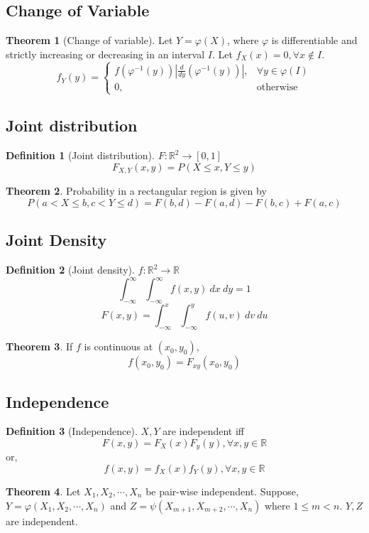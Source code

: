 \documentclass[10pt, a4paper]{extarticle}
\theoremstyle{definition}
\newtheorem{thm}{Theorem}
\newtheorem{defn}{Definition}
\begin{document}
\subsection{Change of Variable}
\begin{thm}[Change of variable]
	Let $Y=\varphi(X)$, where $\varphi$ is differentiable and strictly increasing or decreasing in an interval $I$. Let $f_X(x)=0,\forall x\notin I$.
	\[f_Y(y)=
		\begin{cases}
			f\left(\varphi^{-1}(y)\right)\left|\frac{d}{dy}\left(\varphi^{-1}(y)\right)\right|, & \forall y\in\varphi(I) \\
			0,                                                                                  & \text{otherwise}
		\end{cases}
	\]
\end{thm}

\subsection{Joint distribution}
\begin{defn}[Joint distribution]
	$F:\mathbb{R}^2\to[0,1]$
	\[F_{X,Y}(x,y)=P(X\leq x,Y\leq y)\]
\end{defn}
\begin{thm}
	Probability in a rectangular region is given by
	\[P(a<X\leq b,c<Y\leq d)=F(b,d)-F(a,d)-F(b,c)+F(a,c)\]
\end{thm}

\subsection{Joint Density}
\begin{defn}[Joint density]
	$f:\mathbb{R}^2\to\mathbb{R}$
	\[\int_{-\infty}^\infty \int_{-\infty}^\infty f(x,y)\ dx\ dy=1\]
	\[F(x,y)=\int_{-\infty}^x \int_{-\infty}^y f(u,v)\ dv\ du\]
\end{defn}

\begin{thm}
	If $f$ is continuous at $(x_0,y_0)$,
	\[f(x_0,y_0)=F_{xy}(x_0,y_0)\]
\end{thm}

\subsection{Independence}
\begin{defn}[Independence]
	$X,Y$ are independent iff
	\[F(x,y)=F_X(x)F_y(y),\forall x,y\in\mathbb{R}\]
	or,
	\[f(x,y)=f_X(x)f_Y(y),\forall x,y\in\mathbb{R}\]
\end{defn}
\begin{thm}
	Let $X_1,X_2,\cdots, X_n$ be pair-wise independent. Suppose, $Y=\varphi(X_1,X_2,\cdots,X_n)$ and $Z=\psi(X_{m+1},X_{m+2},\cdots,X_n)$ where $1\leq m<n$. $Y,Z$ are independent.
\end{thm}
\end{document}
